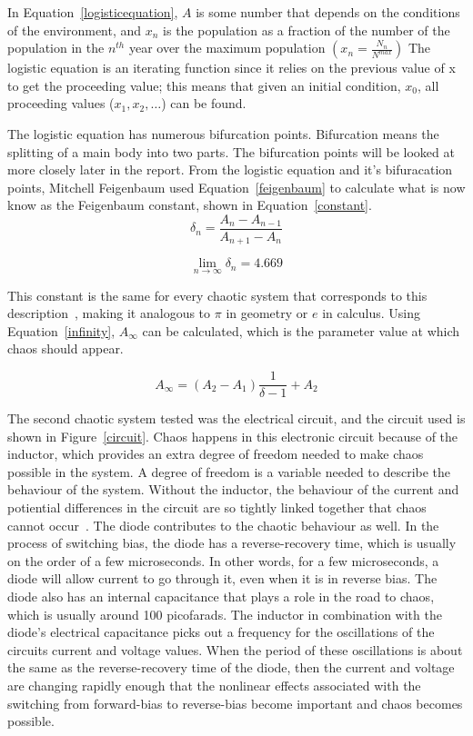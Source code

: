 \documentclass[12pt]{report}
\theoremstyle{definition}
\begin{document}
In Equation~\ref{logisticequation}, $A$ is some number that depends on the conditions of the environment, and $x_n$ is the population as a fraction of the   number of the population in the $n^{th}$ year over the maximum population $\left(x_n=\frac{N_n}{N^{max}}\right)$ The logistic equation is an iterating function since it relies on the previous value of x to get the proceeding value; this means that given an initial condition, $x_0$, all proceeding values ($x_1,x_2,\dots$) can be found.

The logistic equation has numerous bifurcation points. Bifurcation means the splitting of a main body into two parts. The bifurcation points will be looked at more closely later in the report.  From the logistic equation and it's bifuracation points, Mitchell Feigenbaum used Equation~\ref{feigenbaum} to calculate what is now know as the Feigenbaum constant, shown in Equation~\ref{constant}. 
\begin{equation}
\delta_n=\frac{A_n-A_{n-1}}{A_{n+1}-A_n}
\label{feigenbaum}
\end{equation}

\begin{equation}
\lim_{n\rightarrow \infty} \delta_n=4.669
\label{constant}
\end{equation}

This constant is the same for every chaotic system that corresponds to this description~\cite{chaos}, making it  analogous to $\pi$ in geometry or $e$ in calculus. Using Equation~\ref{infinity}, $A_\infty$ can be calculated, which is the parameter value at which chaos should appear. 

\begin{equation}
A_\infty=(A_2-A_1)\frac{1}{\delta-1}+A_2
\label{infinity}
\end{equation}

The second chaotic system tested was the electrical circuit, and the circuit used is shown in Figure~\ref{circuit}. Chaos happens in this electronic circuit because of the inductor, which provides an extra degree of freedom needed to make chaos possible in the system. A degree of freedom is a variable needed to describe the behaviour of the system.  Without the inductor, the behaviour of the current and potiential differences in the circuit are so tightly linked together that chaos cannot occur~\cite{hilborn}. The diode contributes to the chaotic behaviour as well. In the process of switching bias, the diode has a reverse-recovery time, which is usually on the order of a few microseconds. In other words, for a few microseconds, a diode will allow current to go through it, even when it is in reverse bias. The diode also has an internal capacitance that plays a role in the road to chaos, which is usually around 100 picofarads. The inductor in combination with the diode's electrical capacitance picks out a frequency for the oscillations of the circuits current and voltage values. When the period of these oscillations is about the same as the reverse-recovery time of the diode, then the current and voltage are changing rapidly enough that the nonlinear effects associated with the switching from forward-bias to reverse-bias become important and chaos becomes possible. 
\end{document}
